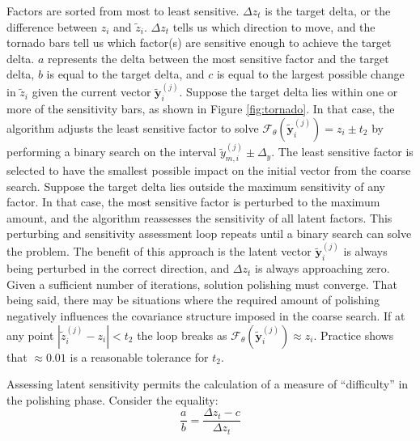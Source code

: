 Factors are sorted from most to least sensitive. $\Delta z_{t}$ is the target delta, or the difference between $z_{i}$ and $\tilde{z}_{i}$. $\Delta z_{t}$ tells us which direction to move, and the tornado bars tell us which factor(s) are sensitive enough to achieve the target delta. $a$ represents the delta between the most sensitive factor and the target delta, $b$ is equal to the target delta, and $c$ is equal to the largest possible change in $\tilde{z}_{i}$ given the current vector $\tilde{\mathbf{y}}_{i}^{(j)}$. Suppose the target delta lies within one or more of the sensitivity bars, as shown in Figure \ref{fig:tornado}. In that case, the algorithm adjusts the least sensitive factor to solve $\mathcal{F}_{\theta}(\tilde{\mathbf{y}}_{i}^{(j)}) = z_{i} \pm t_{2}$ by performing a binary search \citep{nowak2008generalized} on the interval $\tilde{y}_{m, i}^{(j)} \pm \Delta_{y}$. The least sensitive factor is selected to have the smallest possible impact on the initial vector from the coarse search. Suppose the target delta lies outside the maximum sensitivity of any factor. In that case, the most sensitive factor is perturbed to the maximum amount, and the algorithm reassesses the sensitivity of all latent factors. This perturbing and sensitivity assessment loop repeats until a binary search can solve the problem. The benefit of this approach is the latent vector $\tilde{\mathbf{y}}_{i}^{(j)}$ is always being perturbed in the correct direction, and $\Delta z_{t}$ is always approaching zero. Given a sufficient number of iterations, solution polishing must converge. That being said, there may be situations where the required amount of polishing negatively influences the covariance structure imposed in the coarse search. If at any point $|\tilde{z}_{i}^{(j)} - z_{i}| < t_{2}$ the loop breaks as $\mathcal{F}_{\theta}(\tilde{\mathbf{y}}_{i}^{(j)}) \approx z_{i}$. Practice shows that $\approx 0.01$ is a reasonable tolerance for $t_2$.

Assessing latent sensitivity permits the calculation of a measure of ``difficulty'' in the polishing phase. Consider the equality:
\begin{equation}
    \frac{a}{b} = \frac{\Delta z_{t} - c}{\Delta z_{t}}
    \label{eq:aoverb}
\end{equation}

